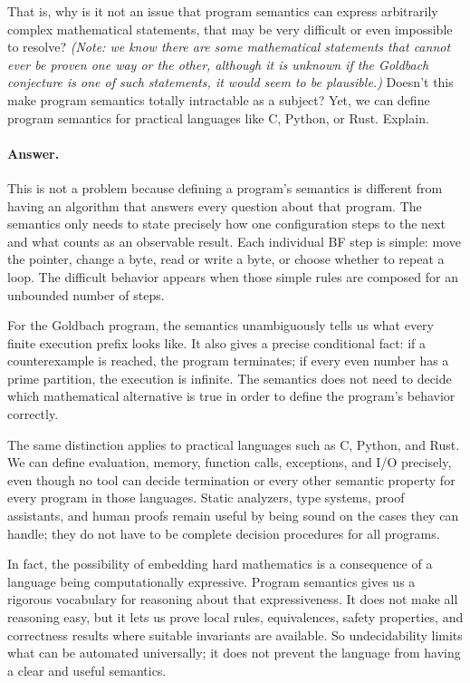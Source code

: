 \documentclass{article}
\begin{document}
\begin{enumerate}
\begin{enumerate}[(a)]
That is, why is it not an issue that program semantics can express arbitrarily complex mathematical statements, that may
be very difficult or even impossible to resolve? \emph{(Note: we know there are some mathematical statements that cannot ever
be proven one way or the other, although it is unknown if the Goldbach conjecture is one of such statements, it would seem to be plausible.)}
Doesn't this make program semantics totally intractable as a subject?
Yet, we can define program semantics for practical languages like C, Python, or Rust.
Explain.

\paragraph{Answer.}
This is not a problem because defining a program's semantics is different from
having an algorithm that answers every question about that program.  The
semantics only needs to state precisely how one configuration steps to the
next and what counts as an observable result.  Each individual BF step is
simple: move the pointer, change a byte, read or write a byte, or choose whether
to repeat a loop.  The difficult behavior appears when those simple rules are
composed for an unbounded number of steps.

For the Goldbach program, the semantics unambiguously tells us what every
finite execution prefix looks like.  It also gives a precise conditional
fact: if a counterexample is reached, the program terminates; if every even
number has a prime partition, the execution is infinite.  The semantics does
not need to decide which mathematical alternative is true in order to define
the program's behavior correctly.

The same distinction applies to practical languages such as C, Python, and
Rust.  We can define evaluation, memory, function calls, exceptions, and I/O
precisely, even though no tool can decide termination or every other semantic
property for every program in those languages.  Static analyzers, type
systems, proof assistants, and human proofs remain useful by being sound on
the cases they can handle; they do not have to be complete decision procedures
for all programs.

In fact, the possibility of embedding hard mathematics is a consequence of a
language being computationally expressive.  Program semantics gives us a
rigorous vocabulary for reasoning about that expressiveness.  It does not make
all reasoning easy, but it lets us prove local rules, equivalences, safety
properties, and correctness results where suitable invariants are available.
So undecidability limits what can be automated universally; it does not prevent
the language from having a clear and useful semantics.
\end{enumerate}


\end{enumerate}
\end{document}
